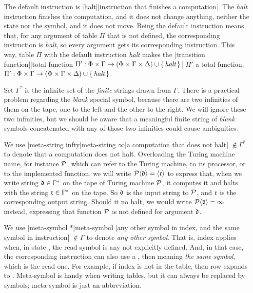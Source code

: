\dest
The default instruction is
|halt||instruction that finishes a computation|.
The {\em halt} instruction finishes the computation, and
it does not change anything, neither the state nor the symbol,
and it does not move.
Being the default instruction means that,
 for any argument of table $\Pi$ that is not defined,
 the corresponding instruction is {\em halt},
 so every argument gets its corresponding instruction.
This way, table $\Pi$ with the default instruction {\em halt} makes
the |transition function||total function
 $ \Pi' : \Phi\times\Gamma \to
 (\Phi\times\Gamma\times\Delta)\cup\{\,\hbox{\it halt}\,\}$|
 $\Pi'$ a total function,
$\Pi':  \Phi\times\Gamma \to
(\Phi\times\Gamma\times\Delta)\cup\{\,\hbox{\it halt}\,\}$.

Set $\Gamma^*$ is the infinite set
 of the {\em finite} strings drawn from $\Gamma$.
There is a practical problem regarding the {\em blank} special symbol,
because there are two infinities of them on the tape,
one to the left and the other to the right.
We will ignore these two infinities,
but we should be aware that
a meaningful finite string of {\em blank} symbols
concatenated with any of those two infinities could
cause ambiguities.

\dest
We use |meta-string infty|meta-string $\infty$|a
 computation that does not halt|
 $\notin \Gamma^*$ to denote that a computation does not halt.
Overloading the Turing machine name, for instance $\cal P$,
which can refer to the Turing machine, to its processor,
or to the implemented function,
we will write $\TM P<d> = \TM<r>$ to express that,
when we write string ${\frak d}\in\Gamma^*$
on the tape of Turing machine $\cal P$,
it computes it and halts
 with the string ${\frak r}\in\Gamma^*$ on the tape.
So $\frak d$ is the input string to $\cal P$,
and $\frak r$ is the corresponding output string.
Should it no halt, we would write $\TM P<d> = \infty$ instead,
expressing that function $\cal P$ is not defined
for argument $\frak d$.

\dest
We use |meta-symbol *|meta-symbol {\tt *}|any other symbol in index,
 and the same symbol in instruction|
 $\notin \Gamma$ to denote {\em any other symbol}.
That is, index  applies when, in state ,
the read symbol is any not explicitly defined.
And, in that case, the corresponding instruction
can also use a \M*, then meaning {\em the same symbol},
which is the read one.
For example, if index  is not in the table,
then row  expands to .
Meta-symbol \M* is handy when writing tables,
 but it can always be replaced by symbols;
meta-symbol \M* is just an abbreviation.

